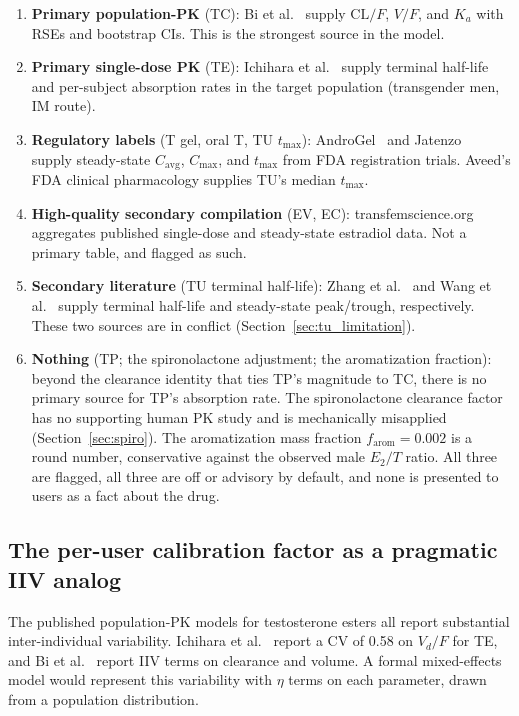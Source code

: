 \documentclass[11pt,a4paper]{article}
\begin{document}
\begin{enumerate}[nosep,leftmargin=1.4em]
\item \textbf{Primary population-PK} (TC): Bi et al.~\cite{bi2018}
  supply $\mathrm{CL}/F$, $V/F$, and $K_a$ with RSEs and bootstrap CIs.
  This is the strongest source in the model.
\item \textbf{Primary single-dose PK} (TE): Ichihara et
  al.~\cite{ichihara2020} supply terminal half-life and per-subject
  absorption rates in the target population (transgender men, IM
  route).
\item \textbf{Regulatory labels} (T gel, oral T, TU $t_{\max}$):
  AndroGel~\cite{androgel} and Jatenzo~\cite{swerdloff2020} supply
  steady-state $C_{\mathrm{avg}}$, $C_{\max}$, and $t_{\max}$ from FDA
  registration trials. Aveed's FDA clinical pharmacology supplies TU's
  median $t_{\max}$.
\item \textbf{High-quality secondary compilation} (EV, EC):
  transfemscience.org~\cite{tfs} aggregates published single-dose and
  steady-state estradiol data. Not a primary table, and flagged as
  such.
\item \textbf{Secondary literature} (TU terminal half-life): Zhang et
  al.~\cite{zhang1998} and Wang et al.~\cite{wang2010} supply
  terminal half-life and steady-state peak/trough, respectively. These
  two sources are in conflict (Section~\ref{sec:tu_limitation}).
\item \textbf{Nothing} (TP; the spironolactone adjustment; the
  aromatization fraction): beyond the clearance identity that ties
  TP's magnitude to TC, there is no primary source for TP's absorption
  rate. The spironolactone clearance factor has no supporting human PK
  study and is mechanically misapplied (Section~\ref{sec:spiro}). The
  aromatization mass fraction $f_{\text{arom}} = 0.002$ is a round number,
  conservative against the observed male $E_2/T$ ratio. All three are
  flagged, all three are off or advisory by default, and none is presented
  to users as a fact about the drug.
\end{enumerate}

\subsection{The per-user calibration factor as a pragmatic IIV analog}
\label{sec:iiv}

The published population-PK models for testosterone esters all report
substantial inter-individual variability. Ichihara et al.~\cite{ichihara2020}
report a CV of 0.58 on $V_d/F$ for TE, and Bi et al.~\cite{bi2018} report
IIV terms on clearance and volume. A formal mixed-effects model would
represent this variability with $\eta$ terms on each parameter, drawn
from a population distribution.
\end{document}
